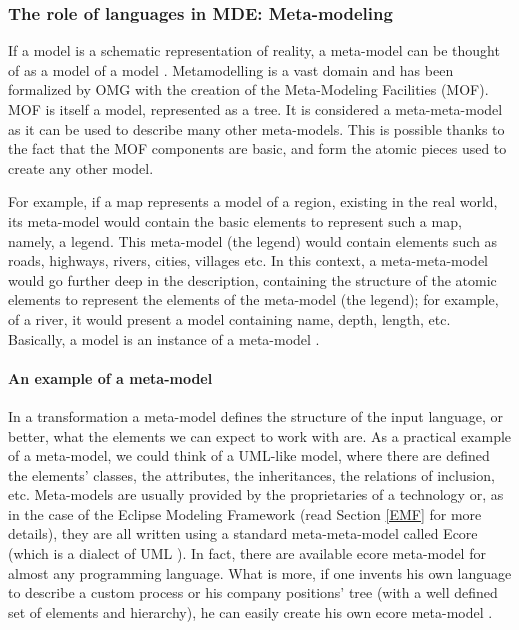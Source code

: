 \subsubsection{The role of languages in MDE: Meta-modeling}
\label{Meta-modeling}
If a model is a schematic representation of reality, a meta-model can be thought of as a model of a model \cite{AcceleoUserGuide}.
Metamodelling is a vast domain and has been formalized by OMG with the creation of the Meta-Modeling Facilities (MOF).
MOF is itself a model, represented as a tree. It is considered a meta-meta-model as it can be used to describe many other meta-models. This is possible thanks to the fact that the MOF components are basic, and form the atomic pieces used to create any other model. 

For example, if a map represents a model of a region, existing in the real world, its meta-model would contain the basic elements to represent such a map, namely, a legend. This meta-model (the legend) would contain elements such as roads, highways, rivers, cities, villages etc. In this context, a meta-meta-model would go further deep in the description, containing the structure of the atomic elements to represent the elements of the meta-model (the legend); for example, of a river, it would present a model containing name, depth, length, etc.  
Basically, a model is an instance of a meta-model \cite{UnderstandMetamodelling}. 

\paragraph{An example of a meta-model}
\label{metamodelExample}
In a transformation a meta-model defines the structure of the input language, or better, what the elements we can expect to work with are. As a practical example of a meta-model, we could think of a UML-like model, where there are defined the elements' classes, the attributes, the inheritances, the relations of inclusion, etc. Meta-models are usually provided by the proprietaries of a technology or, as in the case of the Eclipse Modeling Framework (read Section \ref{EMF} for more details), they are all written using a standard meta-meta-model called Ecore (which is a dialect of UML \cite{EcoreAPI}). In fact, there are available ecore meta-model for almost any programming language. What is more, if one invents his own language to describe a custom process or his company positions' tree (with a well defined set of elements and hierarchy), he can easily create his own ecore meta-model \cite{EcoreExample}.

